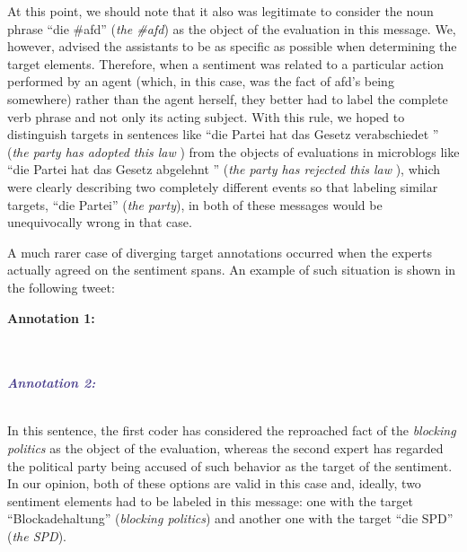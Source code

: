 At this point, we should note that it also was legitimate to consider
the noun phrase ``die \#afd'' (\emph{the \#afd}) as the object of the
evaluation in this message.  We, however, advised the assistants to be
as specific as possible when determining the target
elements. Therefore, when a sentiment was related to a particular
action performed by an agent (which, in this case, was the fact of
afd's being somewhere) rather than the agent herself, they better had
to label the complete verb phrase and not only its acting subject.
With this rule, we hoped to distinguish targets in sentences like
``die Partei hat das Gesetz verabschiedet \smiley{}'' (\emph{the party
  has adopted this law \smiley{}}) from the objects of evaluations in
microblogs like ``die Partei hat das Gesetz abgelehnt \smiley{}''
(\emph{the party has rejected this law \smiley{}}), which were clearly
describing two completely different events so that labeling similar
targets, \eg{} ``die Partei'' (\emph{the party}), in both of these
messages would be unequivocally wrong in that case.

A much rarer case of diverging target annotations occurred when the
experts actually agreed on the sentiment spans.  An example of such
situation is shown in the following tweet:
\begin{example}\label{snt:exmp:targt-disagr}
  \textcolor{red3}{\textbf{Annotation
      1:}}\\
  \upshape{}\\[0.5em]
  \noindent\itshape{}\\[0.6em]\itshape

  \noindent\textcolor{darkslateblue}{\textbf{\itshape Annotation
      2:}}\\
  \upshape{}\\[0.5em]
  \noindent\itshape{}
\end{example}

In this sentence, the first coder has considered the reproached fact
of the \emph{blocking politics} as the object of the evaluation,
whereas the second expert has regarded the political party being
accused of such behavior as the target of the sentiment.  In our
opinion, both of these options are valid in this case and, ideally,
two sentiment elements had to be labeled in this message: one with the
target ``Blockadehaltung'' (\emph{blocking politics}) and another one
with the target ``die SPD'' (\emph{the SPD}).

